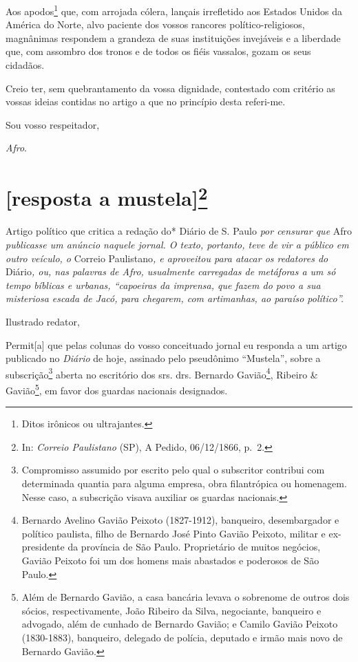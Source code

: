 Aos apodos\footnote{Ditos irônicos ou ultrajantes.} que, com arrojada
cólera, lançais irrefletido aos Estados Unidos da América do Norte, alvo
paciente dos vossos rancores político-religiosos, magnânimas respondem a
grandeza de suas instituições invejáveis e a liberdade que, com assombro
dos tronos e de todos os fiéis vassalos, gozam os seus cidadãos.

Creio ter, sem quebrantamento da vossa dignidade, contestado com
critério as vossas ideias contidas no artigo a que no princípio desta
referi-me.

Sou vosso respeitador,

\emph{Afro}.

\chapter{{[}resposta a mustela{]}\footnote{In: \emph{Correio Paulistano} (SP), A Pedido, 06/12/1866, p.~2.}}

\begin{didascalia}
Artigo político que critica a redação do* Diário de S. Paulo \emph{por
censurar que} Afro \emph{publicasse um anúncio naquele jornal. O texto,
portanto, teve de vir a público em outro veículo, o} Correio
Paulistano\emph{, e aproveitou para atacar os redatores do}
Diário\emph{, ou, nas palavras de Afro, usualmente carregadas de
metáforas a um só tempo bíblicas e urbanas, ``capoeiras da imprensa, que
fazem do povo a sua misteriosa escada de Jacó, para chegarem, com
artimanhas, ao paraíso político''.}
\end{didascalia}

\asterisc{}

Ilustrado redator,

Permit{[}a{]} que pelas colunas do vosso conceituado jornal eu responda
a um artigo publicado no \emph{Diário} de hoje, assinado pelo pseudônimo
``Mustela'', sobre a subscrição\footnote{Compromisso assumido por
  escrito pelo qual o subscritor contribui com determinada quantia para
  alguma empresa, obra filantrópica ou homenagem. Nesse caso, a
  subscrição visava auxiliar os guardas nacionais.} aberta no escritório
dos srs. drs. Bernardo Gavião\footnote{Bernardo Avelino Gavião Peixoto
  (1827-1912), banqueiro, desembargador e político paulista, filho de
  Bernardo José Pinto Gavião Peixoto, militar e ex-presidente da
  província de São Paulo. Proprietário de muitos negócios, Gavião
  Peixoto foi um dos homens mais abastados e poderosos de São Paulo.},
Ribeiro \& Gavião\footnote{Além de Bernardo Gavião, a casa bancária
  levava o sobrenome de outros dois sócios, respectivamente, João
  Ribeiro da Silva, negociante, banqueiro e advogado, além de cunhado de
  Bernardo Gavião; e Camilo Gavião Peixoto (1830-1883), banqueiro,
  delegado de polícia, deputado e irmão mais novo de Bernardo Gavião.},
em favor dos guardas nacionais designados.

